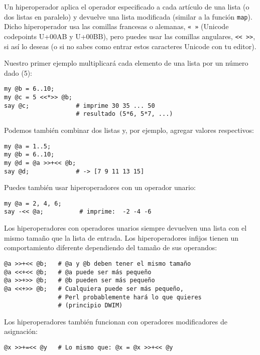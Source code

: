 Un hiperoperador aplica el operador especificado a cada
artículo de una lista (o dos listas en paralelo) y devuelve
una lista modificada (similar a la función {\tt map}).
Dicho hiperoperador usa las comillas francesas o alemanas, 
\verb|« »| (Unicode codepoints U+00AB y U+00BB), pero puedes
usar las comillas angulares, \verb|<< >>|, si así lo deseas
(o si no sabes como entrar estos caracteres Unicode con tu 
editor).

Nuestro primer ejemplo multiplicará cada elemento de una lista
por un número dado (5):

\begin{verbatim}
my @b = 6..10;
my @c = 5 <<*>> @b;
say @c;             # imprime 30 35 ... 50 
					# resultado (5*6, 5*7, ...)
\end{verbatim}

Podemos también combinar dos listas y, por ejemplo, agregar
valores respectivos:

\begin{verbatim}
my @a = 1..5;
my @b = 6..10;
my @d = @a >>+<< @b;
say @d;             # -> [7 9 11 13 15]
\end{verbatim}

Puedes también usar hiperoperadores con un operador unario:

\begin{verbatim}
my @a = 2, 4, 6;
say -<< @a;          # imprime:  -2 -4 -6
\end{verbatim}

Los hiperoperadores con operadores unarios siempre devuelven
una lista con el mismo tamaño que la lista de entrada. 
Los hiperoperadores infijos tienen un comportamiento diferente
dependiendo del tamaño de sus operandos:

\begin{verbatim}
@a >>+<< @b;   # @a y @b deben tener el mismo tamaño
@a <<+<< @b;   # @a puede ser más pequeño
@a >>+>> @b;   # @b pueden ser más pequeño
@a <<+>> @b;   # Cualquiera puede ser más pequeño, 
               # Perl probablemente hará lo que quieres 
               # (principio DWIM)
\end{verbatim}

Los hiperoperadores también funcionan con operadores 
modificadores de asignación:

\begin{verbatim}
@x >>+=<< @y   # Lo mismo que: @x = @x >>+<< @y
\end{verbatim}


